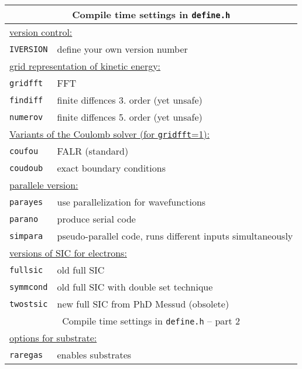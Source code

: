 \documentclass[12pt]{article}
\begin{document}
\begin{enumerate}
\begin{tabular}{ll}
\hline
\multicolumn{2}{c}{Compile time settings in {\tt define.h}} \\
\hline
\multicolumn{2}{l}{\underline{version control:}}\\
{\tt IVERSION} & define your own version number\\
\hline
\multicolumn{2}{l}{\underline{grid representation of kinetic energy:}}\\
{\tt gridfft} & FFT \\
{\tt findiff} & finite diffences 3. order (yet unsafe)\\
{\tt numerov} & finite diffences 5. order (yet unsafe)\\
\hline
\multicolumn{2}{l}{\underline{Variants of the Coulomb solver (for {\tt gridfft}=1):}}\\
{\tt coufou} & FALR (standard)\\
{\tt coudoub} & exact boundary conditions\\
\hline
\multicolumn{2}{l}{\underline{parallele version:}}\\
{\tt parayes} & use parallelization for wavefunctions \\
{\tt parano}  & produce serial code\\
{\tt simpara} & pseudo-parallel code, runs different inputs
simultaneously\\
\hline
\multicolumn{2}{l}{\underline{versions of SIC for electrons:}}\\
{\tt fullsic} & old full SIC  \\
{\tt symmcond} & old full SIC with double set technique \\
{\tt twostsic} & new full SIC from PhD Messud (obsolete)\\
\hline
\multicolumn{2}{c}{Compile time settings in {\tt define.h} -- part 2} \\
\hline
\multicolumn{2}{l}{\underline{options for substrate:}}\\
{\tt raregas} & enables substrates\\
\hline
\end{tabular}

\newpage


\end{enumerate}
\end{document}
